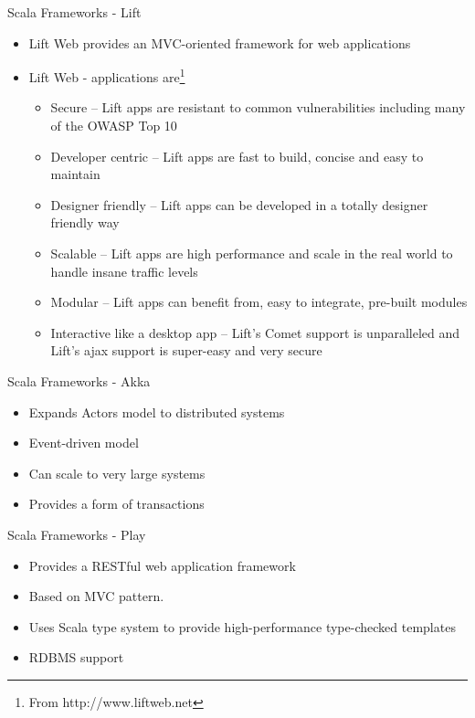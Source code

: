 \documentclass[t]{beamer}
\begin{document}
\begin{frame}{Scala Frameworks - Lift}
  \begin{itemize}
  \item Lift Web provides an MVC-oriented framework for web applications
  \item Lift Web - applications are\footnote{From http://www.liftweb.net}
    \begin{itemize}
    \item Secure -- Lift apps are resistant to common vulnerabilities
      including many of the OWASP Top 10 
    \item Developer centric -- Lift apps are fast to build, concise and
       easy to maintain
     \item Designer friendly -- Lift apps can be developed in a totally
       designer friendly way 
     \item Scalable -- Lift apps are high performance and scale in the
       real world to handle insane traffic levels 
     \item Modular -- Lift apps can benefit from, easy to integrate, 
       pre-built modules
     \item Interactive like a desktop app -- Lift's Comet support is
       unparalleled and Lift's ajax support is super-easy and very
       secure
  \end{itemize}
  \end{itemize}
  \note{}
\end{frame}

\begin{frame}{Scala Frameworks - Akka}
  \begin{itemize}
  \item Expands Actors model to distributed systems
  \item Event-driven model
  \item Can scale to very large systems
  \item Provides a form of transactions
  \end{itemize}
  \note{}
\end{frame}


\begin{frame}{Scala Frameworks - Play}
  \begin{itemize}
  \item Provides a RESTful web application framework
  \item Based on MVC pattern.
  \item Uses Scala type system to provide high-performance
    type-checked templates  
  \item RDBMS support
  \end{itemize}
  \note{}
\end{frame}
\end{document}
